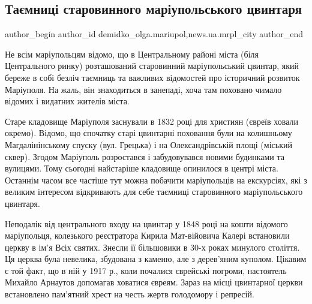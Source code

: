  
 
 
 
 
 
\subsection{Таємниці старовинного маріупольського цвинтаря}
\label{sec:20_11_2017.stz.news.ua.mrpl_city.1.tajemnyci_cvyntar}
 
\ifcmt
 author_begin
   author_id demidko_olga.mariupol,news.ua.mrpl_city
 author_end
\fi

Не всім маріупольцям відомо, що в Центральному районі міста (біля Центрального
ринку) розташований старовинний маріупольський цвинтар, який береже в собі
безліч таємниць та важливих відомостей про історичний розвиток Маріуполя. На
жаль, він знаходиться в занепаді, хоча там поховано чимало відомих і видатних
жителів міста.

Старе кладовище Маріуполя заснували в 1832 році для християн (євреїв ховали
окремо). Відомо, що спочатку старі цвинтарні поховання були на колишньому
Магдалінінському спуску (вул. Грецька) і на Олександрівській площі (міський
сквер). Згодом Маріуполь розростався і забудовувався новими будинками та
вулицями. Тому сьогодні найстаріше кладовище опинилося в центрі міста. Останнім
часом все частіше тут можна побачити маріупольців на екскурсіях, які з великим
інтересом відкривають для себе таємниці старовинного маріупольського цвинтаря.


Неподалік від центрального входу на цвинтар у 1848 році на кошти відомого
маріупольця, колезького реєстратора Кирила Мат\hyp{}війовича Калері встановили церкву
в ім'я Всіх святих. Знесли її більшовики в 30-х роках минулого століття. Ця
церква була невелика, збудована з каменю, але з дерев'яним куполом. Цікавим є
той факт, що в ній у 1917 р., коли почалися єврейські погроми, настоятель
Михайло Арнаутов допомагав ховатися євреям. Зараз на місці цвинтарної церкви
встановлено пам'ятний хрест на честь жертв голодомору і репресій. 

